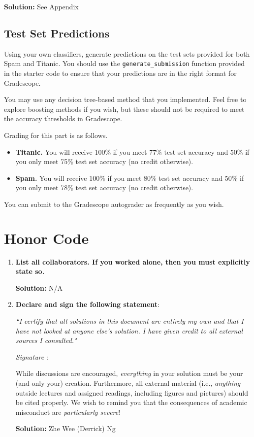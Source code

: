\documentclass{article}
\newcommand{\Question}[1]{\Large \section{ #1 } \normalsize}
\newenvironment{solution}{\color{blue} \smallskip \textbf{Solution:}}{}
\begin{document}
\begin{solution}
    See Appendix
\end{solution}

\newpage
\subsection{Test Set Predictions}
Using your own classifiers, generate predictions on the test sets provided for both Spam and Titanic. 
You should use the \verb|generate_submission| function provided in the starter code to ensure that your predictions are in the right format for Gradescope. 

You may use any decision tree-based method that you implemented. 
Feel free to explore boosting methods if you wish, but these should not be required to meet the accuracy thresholds in Gradescope.

Grading for this part is as follows.
\begin{itemize}
    \item \textbf{Titanic.} You will receive 100\% if you meet 77\% test set accuracy and 50\% if you only meet 75\% test set accuracy (no credit otherwise).
    \item \textbf{Spam.} You will receive 100\% if you meet 80\% test set accuracy and 50\% if you only meet 78\% test set accuracy (no credit otherwise).
\end{itemize}
You can submit to the Gradescope autograder as frequently as you wish.


\newpage
\Question{Honor Code}

\begin{enumerate}
    \item 
    \textbf{List all collaborators. If you worked alone, then you must explicitly state so.}

    \begin{solution}
        N/A
    \end{solution}

    \item
    \textbf{Declare and sign the following statement}: 
    
    \textit{``I certify that all solutions in this document are entirely my own and that I have not looked at anyone else's solution. I have given credit to all external sources I consulted."}
    
    \textit{Signature} : \hrulefill
    
    While discussions are encouraged, \emph{everything} in your solution must be your (and only your) creation. 
    Furthermore, all external material  (i.e., \emph{anything} outside lectures and assigned
    readings, including figures and pictures) should be cited properly.
    We wish to remind you that the consequences of academic misconduct are \emph{particularly severe}!

    \begin{solution}
        Zhe Wee (Derrick) Ng
    \end{solution}
    
\end{enumerate}\newpage
\end{document}
